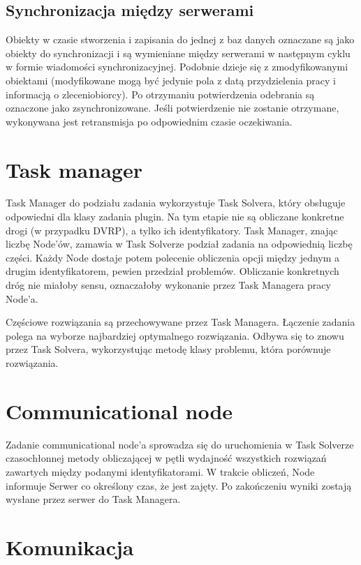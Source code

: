 \documentclass[12pt,a4paper,titlepage]{report}
\begin{document}
	\section{Synchronizacja między serwerami}
		Obiekty w czasie stworzenia i zapisania do jednej z baz danych oznaczane są jako obiekty
		do synchronizacji i są wymieniane między serwerami w następnym cyklu w formie wiadomości
		synchronizacyjnej. Podobnie dzieje się z zmodyfikowanymi obiektami (modyfikowane
		mogą być jedynie pola z datą przydzielenia pracy i informacją o zleceniobiorcy).
		Po otrzymaniu potwierdzenia odebrania są oznaczone jako zsynchronizowane. Jeśli
		potwierdzenie nie zostanie otrzymane, wykonywana jest retransmisja po odpowiednim
		czasie oczekiwania.
	
	\chapter{Task manager}
		Task Manager do podziału zadania wykorzystuje Task Solvera, który obsługuje odpowiedni dla klasy zadania plugin. Na tym etapie nie są obliczane konkretne drogi (w przypadku DVRP), a tylko ich identyfikatory. Task Manager, znając liczbę Node'ów, zamawia w Task Solverze podział zadania na odpowiednią liczbę części. Każdy Node dostaje potem polecenie obliczenia opcji między jednym a drugim identyfikatorem, pewien przedział problemów. Obliczanie konkretnych dróg nie miałoby sensu, oznaczałoby wykonanie przez Task Managera pracy Node'a.
		
		Częściowe rozwiązania są przechowywane przez Task Managera. Łączenie zadania polega na wyborze najbardziej optymalnego rozwiązania. Odbywa się to znowu przez Task Solvera, wykorzystując metodę klasy problemu, która porównuje rozwiązania.
	
	\chapter{Communicational node}
		Zadanie communicational node'a sprowadza się do uruchomienia w Task Solverze czasochłonnej metody obliczającej w pętli wydajność wszystkich rozwiązań zawartych między podanymi identyfikatorami. W trakcie obliczeń, Node informuje Serwer co określony czas, że jest zajęty. Po zakończeniu wyniki zostają wysłane przez serwer do Task Managera.
		
	\chapter{Komunikacja}
\end{document}
